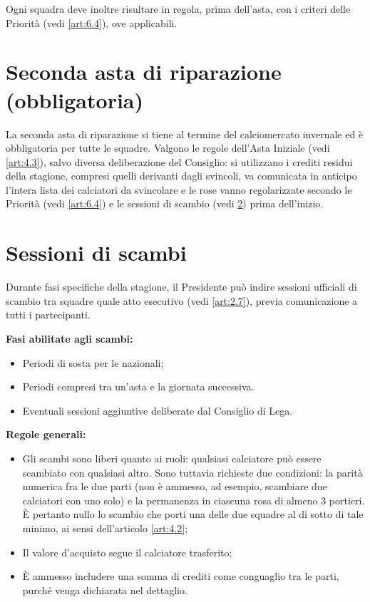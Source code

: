 Ogni squadra deve inoltre risultare in regola, prima dell'asta, con i criteri delle Priorità (vedi \ref{art:6.4}), ove applicabili.

\section{Seconda asta di riparazione (obbligatoria)}
\label{art:6.2}

La seconda asta di riparazione si tiene al termine del calciomercato invernale ed è obbligatoria per tutte le squadre. Valgono le regole dell'Asta Iniziale (vedi \ref{art:4.3}), salvo diversa deliberazione del Consiglio: si utilizzano i crediti residui della stagione, compresi quelli derivanti dagli svincoli, va comunicata in anticipo l'intera lista dei calciatori da svincolare e le rose vanno regolarizzate secondo le Priorità (vedi \ref{art:6.4}) e le sessioni di scambio (vedi \ref{art:6.3}) prima dell'inizio.

\section{Sessioni di scambi}
\label{art:6.3}

Durante fasi specifiche della stagione, il Presidente può indire sessioni ufficiali di scambio tra squadre quale atto esecutivo (vedi \ref{art:2.7}), previa comunicazione a tutti i partecipanti.

\textbf{Fasi abilitate agli scambi:}
\begin{itemize}
\item Periodi di sosta per le nazionali;
\item Periodi compresi tra un'asta e la giornata successiva.
\item Eventuali sessioni aggiuntive deliberate dal Consiglio di Lega.
\end{itemize}

\textbf{Regole generali:}
\begin{itemize}
\item Gli scambi sono liberi quanto ai ruoli: qualsiasi calciatore può essere scambiato con qualsiasi altro. Sono tuttavia richieste due condizioni: la parità numerica fra le due parti (non è ammesso, ad esempio, scambiare due calciatori con uno solo) e la permanenza in ciascuna rosa di almeno 3 portieri. È pertanto nullo lo scambio che porti una delle due squadre al di sotto di tale minimo, ai sensi dell'articolo \ref{art:4.2};
\item Il valore d'acquisto segue il calciatore trasferito;
\item È ammesso includere una somma di crediti come conguaglio tra le parti, purché venga dichiarata nel dettaglio.
\end{itemize}

